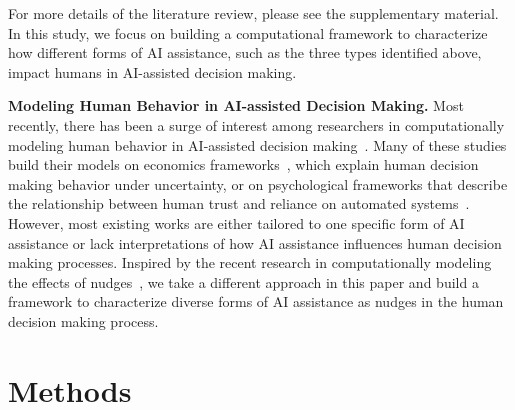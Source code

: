 \documentclass[letterpaper]{article} %
\begin{document}
For more details of the literature review, please see the supplementary material. In this study, we focus on
building a computational framework to characterize how different forms of AI assistance, such as the three types identified above, impact humans in AI-assisted decision making.


\noindent\textbf{Modeling Human Behavior in AI-assisted Decision Making.} Most recently, there has been a surge of interest among researchers in computationally modeling human behavior in AI-assisted decision making~\cite{Bansal2021IsTM,kumar2021explaining,tejeda2022ai, Pynadath2019AMM, Li_Lu_Yin_2023,lu2023strategic}.
Many of these studies build their models on economics frameworks~\cite{wang2022will}, which explain human decision making behavior under uncertainty, or on psychological frameworks that describe the relationship between human trust and reliance on automated systems~\cite{ajenaghughrure2019predictive,Li_Lu_Yin_2023}.
However, most existing works are either tailored to one specific form of AI assistance or lack interpretations of how AI assistance influences human decision making processes.
Inspired by the recent research in computationally modeling the effects of nudges~\cite{callaway2022optimal}, we take a different approach in this paper and build a framework to characterize diverse forms of AI assistance as nudges in the human decision making process.



\section{Methods}
\end{document}
